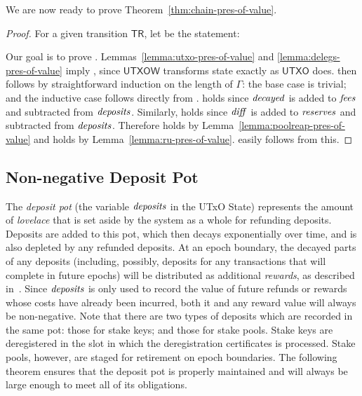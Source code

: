 \noindent
We are now ready to prove Theorem~\ref{thm:chain-pres-of-value}.

\begin{proof}
  For a given transition $\mathsf{TR}$, let 
  be the statement:


  \noindent
  Our goal is to prove .
  Lemmas~\ref{lemma:utxo-pres-of-value} and \ref{lemma:delegs-pres-of-value} imply ,
  since $\mathsf{UTXOW}$ transforms state exactly as $\mathsf{UTXO}$ does.
   then follows by straightforward induction on the length of $\Gamma$:
  the base case is trivial;
  and the inductive case follows directly from .
%
   holds since $\mathit{decayed}$ is added to $\mathit{fees}$
  and subtracted from $\mathit{deposits}$.
  Similarly,  holds since $\mathit{diff}$ is added to $\mathit{reserves}$
  and subtracted from $\mathit{deposits}$.
  Therefore  holds by Lemma~\ref{lemma:poolreap-pres-of-value}
  and  holds by Lemma~\ref{lemma:ru-pres-of-value}.
   easily follows from this.
\end{proof}

\subsection{Non-negative Deposit Pot}
\label{sec:non-negative-deposit-pot}

The \emph{deposit pot} (the variable $\mathit{deposits}$ in the UTxO State)
represents the amount of \emph{lovelace} that is set aside by the system as a whole for refunding deposits.
Deposits are added to this pot, which then decays exponentially over time,
and is also depleted by any refunded deposits.
At an epoch boundary, the decayed parts of any deposits (including, possibly, deposits for any transactions that will complete in future epochs)
will be distributed as additional \emph{rewards}, as described in~\cite{delegation_design}.
Since $\mathit{deposits}$ is only used to record the value of future refunds or rewards whose costs have
already been incurred, both it and any reward value will always be non-negative.
Note that there are two types of deposits which are recorded in the same pot: those for stake keys; and those for stake pools.
Stake keys are deregistered in the slot in which the deregistration certificates
is processed. Stake pools, however, are staged for retirement on epoch boundaries.
%
The following theorem ensures that the deposit pot is properly maintained
and will always be large enough to meet all of its obligations.


